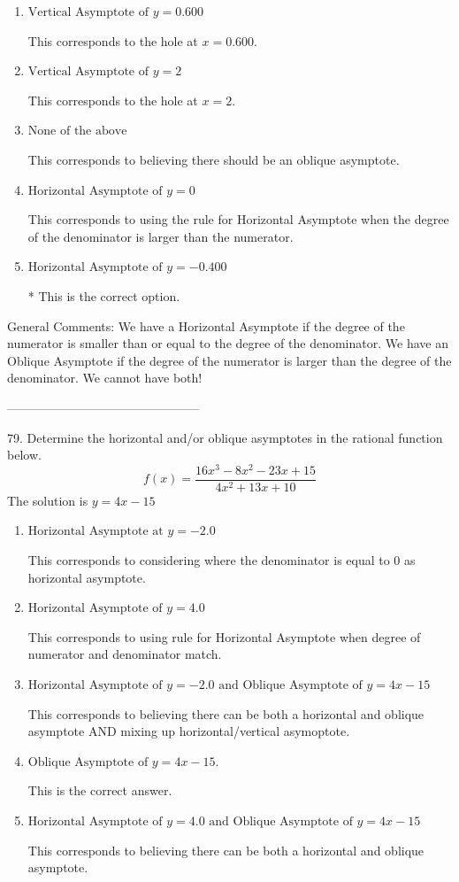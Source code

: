 \documentclass{extbook}[14pt]
\begin{document}
\begin{enumerate}[label=\Alph*.] 
\item $ \text{Vertical Asymptote of } y = 0.600  $ 

 This corresponds to the hole at $x = 0.600$. 
\item $ \text{Vertical Asymptote of } y = 2  $ 

 This corresponds to the hole at $x = 2$. 
\item $ \text{None of the above} $ 

 This corresponds to believing there should be an oblique asymptote. 
\item $ \text{Horizontal Asymptote of } y = 0  $ 

 This corresponds to using the rule for Horizontal Asymptote when the degree of the denominator is larger than the numerator. 
\item $ \text{Horizontal Asymptote of } y = -0.400  $ 

 * This is the correct option. 
\end{enumerate} 
 
General Comments: We have a Horizontal Asymptote if the degree of the numerator is smaller than or equal to the degree of the denominator. We have an Oblique Asymptote if the degree of the numerator is larger than the degree of the denominator. We cannot have both!

-----------------------------------------------

79. Determine the horizontal and/or oblique asymptotes in the rational function below.
\[ f(x) = \frac{16x^{3} -8 x^{2} -23 x + 15}{4x^{2} +13 x + 10} \] 
The solution is $ y = 4x -15 $ 

\begin{enumerate}[label=\Alph*.] 
\item $ \text{Horizontal Asymptote at } y = -2.0 $ 

 This corresponds to considering where the denominator is equal to 0 as horizontal asymptote. 
\item $ \text{Horizontal Asymptote of } y = 4.0  $ 

 This corresponds to using rule for Horizontal Asymptote when degree of numerator and denominator match. 
\item $ \text{Horizontal Asymptote of } y = -2.0 \text{ and Oblique Asymptote of } y = 4x -15 $ 

 This corresponds to believing there can be both a horizontal and oblique asymptote AND mixing up horizontal/vertical asymoptote. 
\item $ \text{Oblique Asymptote of } y = 4x -15. $ 

 This is the correct answer. 
\item $ \text{Horizontal Asymptote of } y = 4.0 \text{ and Oblique Asymptote of } y = 4x -15 $ 

 This corresponds to believing there can be both a horizontal and oblique asymptote. 
\end{enumerate} 
 
\end{document}
